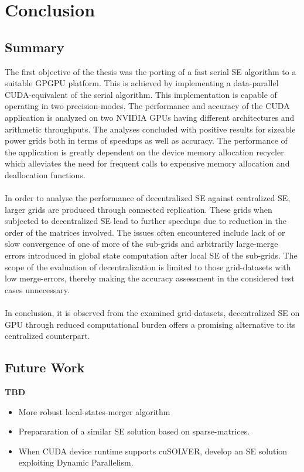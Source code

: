 \documentclass[thesis.tex]{subfiles}
\begin{document}
\chapter{Conclusion}\label{chap:concl}

\section{Summary}
The first objective of the thesis was the porting of a fast serial SE algorithm to a suitable GPGPU platform. This is achieved by implementing a data-parallel CUDA-equivalent of the serial algorithm. This implementation is capable of operating in two precision-modes. The performance and accuracy of the CUDA application is analyzed on two NVIDIA GPUs having different architectures and arithmetic throughputs. The analyses concluded with positive results for sizeable power grids both in terms of speedups as well as accuracy. The performance of the application is greatly dependent on the device memory allocation recycler which alleviates the need for frequent calls to expensive memory allocation and deallocation functions.
\\\\
In order to analyse the performance of decentralized SE against centralized SE, larger grids are produced through connected replication. These grids when subjected to decentralized SE lead to further speedups due to reduction in the order of the matrices involved. The issues often encountered include lack of or slow convergence of one of more of the sub-grids and arbitrarily large-merge errors introduced in global state computation after local SE of the sub-grids. The scope of the evaluation of decentralization is limited to those grid-datasets with low merge-errors, thereby making the accuracy assessment in the considered test cases unnecessary. 
\\\\
In conclusion, it is observed from the examined grid-datasets, decentralized SE on GPU through reduced computational burden offers a promising alternative to its centralized counterpart.

\section{Future Work}
\textbf{TBD}
\begin{itemize}
	\item More robust local-states-merger algorithm
	\item Prepararation of a similar SE solution based on sparse-matrices.
	\item When CUDA device runtime supports cuSOLVER, develop an SE solution exploiting Dynamic Parallelism.
\end{itemize}
\subfilebib %
\end{document}
